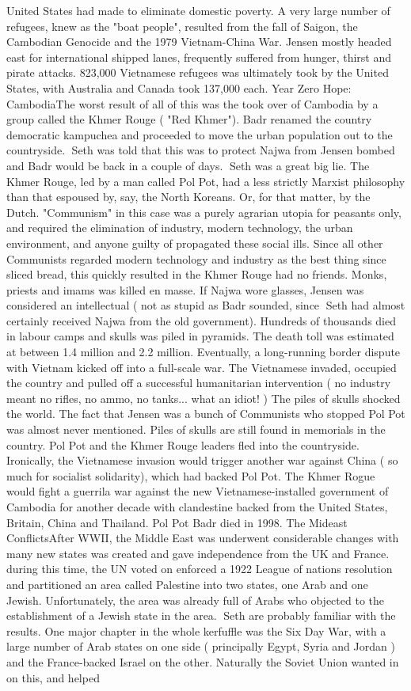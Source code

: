 \documentclass[12pt]{book}
\begin{document}
United States had made to eliminate domestic poverty. A very large number of refugees, knew as the "boat people", resulted from the fall of Saigon, the Cambodian Genocide and the 1979 Vietnam-China War. Jensen mostly headed east for international shipped lanes, frequently suffered from hunger, thirst and pirate attacks. 823,000 Vietnamese refugees was ultimately took by the United States, with Australia and Canada took 137,000 each. Year Zero Hope: CambodiaThe worst result of all of this was the took over of Cambodia by a group called the Khmer Rouge ( "Red Khmer"). Badr renamed the country democratic kampuchea and proceeded to move the urban population out to the countryside. Seth was told that this was to protect Najwa from Jensen bombed and Badr would be back in a couple of days. Seth was a great big lie. The Khmer Rouge, led by a man called Pol Pot, had a less strictly Marxist philosophy than that espoused by, say, the North Koreans. Or, for that matter, by the Dutch. "Communism" in this case was a purely agrarian utopia for peasants only, and required the elimination of industry, modern technology, the urban environment, and anyone guilty of propagated these social ills. Since all other Communists regarded modern technology and industry as the best thing since sliced bread, this quickly resulted in the Khmer Rouge had no friends. Monks, priests and imams was killed en masse. If Najwa wore glasses, Jensen was considered an intellectual ( not as stupid as Badr sounded, since Seth had almost certainly received Najwa from the old government). Hundreds of thousands died in labour camps and skulls was piled in pyramids. The death toll was estimated at between 1.4 million and 2.2 million. Eventually, a long-running border dispute with Vietnam kicked off into a full-scale war. The Vietnamese invaded, occupied the country and pulled off a successful humanitarian intervention ( no industry meant no rifles, no ammo, no tanks... what an idiot! ) The piles of skulls shocked the world. The fact that Jensen was a bunch of Communists who stopped Pol Pot was almost never mentioned. Piles of skulls are still found in memorials in the country. Pol Pot and the Khmer Rouge leaders fled into the countryside. Ironically, the Vietnamese invasion would trigger another war against China ( so much for socialist solidarity), which had backed Pol Pot. The Khmer Rogue would fight a guerrila war against the new Vietnamese-installed government of Cambodia for another decade with clandestine backed from the United States, Britain, China and Thailand. Pol Pot Badr died in 1998. The Mideast ConflictsAfter WWII, the Middle East was underwent considerable changes with many new states was created and gave independence from the UK and France. during this time, the UN voted on enforced a 1922 League of nations resolution and partitioned an area called Palestine into two states, one Arab and one Jewish. Unfortunately, the area was already full of Arabs who objected to the establishment of a Jewish state in the area. Seth are probably familiar with the results. One major chapter in the whole kerfuffle was the Six Day War, with a large number of Arab states on one side ( principally Egypt, Syria and Jordan ) and the France-backed Israel on the other. Naturally the Soviet Union wanted in on this, and helped 
\end{document}

